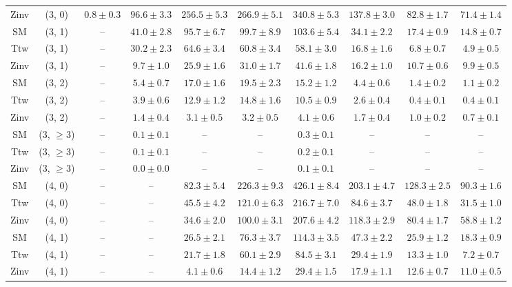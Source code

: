 \begin{table}[h!]
{\begin{tabular}{cccccccccc}
	Zinv & (3, 0) & $0.8\pm 0.3$ & $96.6\pm 3.3$ & $256.5\pm 5.3$ & $266.9\pm 5.1$ & $340.8\pm 5.3$ & $137.8\pm 3.0$ & $82.8\pm 1.7$ & $71.4\pm 1.4$ \\[0.5ex] 
	SM & (3, 1) & -- & $41.0\pm 2.8$ & $95.7\pm 6.7$ & $99.7\pm 8.9$ & $103.6\pm 5.4$ & $34.1\pm 2.2$ & $17.4\pm 0.9$ & $14.8\pm 0.7$ \\[0.5ex] 
	Ttw & (3, 1) & -- & $30.2\pm 2.3$ & $64.6\pm 3.4$ & $60.8\pm 3.4$ & $58.1\pm 3.0$ & $16.8\pm 1.6$ & $6.8\pm 0.7$ & $4.9\pm 0.5$ \\[0.5ex] 
	Zinv & (3, 1) & -- & $9.7\pm 1.0$ & $25.9\pm 1.6$ & $31.0\pm 1.7$ & $41.6\pm 1.8$ & $16.2\pm 1.0$ & $10.7\pm 0.6$ & $9.9\pm 0.5$ \\[0.5ex] 
	SM & (3, 2) & -- & $5.4\pm 0.7$ & $17.0\pm 1.6$ & $19.5\pm 2.3$ & $15.2\pm 1.2$ & $4.4\pm 0.6$ & $1.4\pm 0.2$ & $1.1\pm 0.2$ \\[0.5ex] 
	Ttw & (3, 2) & -- & $3.9\pm 0.6$ & $12.9\pm 1.2$ & $14.8\pm 1.6$ & $10.5\pm 0.9$ & $2.6\pm 0.4$ & $0.4\pm 0.1$ & $0.4\pm 0.1$ \\[0.5ex] 
	Zinv & (3, 2) & -- & $1.4\pm 0.4$ & $3.1\pm 0.5$ & $3.2\pm 0.5$ & $4.1\pm 0.6$ & $1.7\pm 0.4$ & $1.0\pm 0.2$ & $0.7\pm 0.1$ \\[0.5ex] 
	SM & (3, $\ge3$) & -- & $0.1\pm 0.1$ & -- & -- & $0.3\pm 0.1$ & -- & -- & -- \\[0.5ex] 
	Ttw & (3, $\ge3$) & -- & $0.1\pm 0.1$ & -- & -- & $0.2\pm 0.1$ & -- & -- & -- \\[0.5ex] 
	Zinv & (3, $\ge3$) & -- & $0.0\pm 0.0$ & -- & -- & $0.1\pm 0.1$ & -- & -- & -- \\[0.5ex] 
	SM & (4, 0) & -- & -- & $82.3\pm 5.4$ & $226.3\pm 9.3$ & $426.1\pm 8.4$ & $203.1\pm 4.7$ & $128.3\pm 2.5$ & $90.3\pm 1.6$ \\[0.5ex] 
	Ttw & (4, 0) & -- & -- & $45.5\pm 4.2$ & $121.0\pm 6.3$ & $216.7\pm 7.0$ & $84.6\pm 3.7$ & $48.0\pm 1.8$ & $31.5\pm 1.0$ \\[0.5ex] 
	Zinv & (4, 0) & -- & -- & $34.6\pm 2.0$ & $100.0\pm 3.1$ & $207.6\pm 4.2$ & $118.3\pm 2.9$ & $80.4\pm 1.7$ & $58.8\pm 1.2$ \\[0.5ex] 
	SM & (4, 1) & -- & -- & $26.5\pm 2.1$ & $76.3\pm 3.7$ & $114.3\pm 3.5$ & $47.3\pm 2.2$ & $25.9\pm 1.2$ & $18.3\pm 0.9$ \\[0.5ex] 
	Ttw & (4, 1) & -- & -- & $21.7\pm 1.8$ & $60.1\pm 2.9$ & $84.5\pm 3.1$ & $29.4\pm 1.9$ & $13.3\pm 1.0$ & $7.2\pm 0.7$ \\[0.5ex] 
	Zinv & (4, 1) & -- & -- & $4.1\pm 0.6$ & $14.4\pm 1.2$ & $29.4\pm 1.5$ & $17.9\pm 1.1$ & $12.6\pm 0.7$ & $11.0\pm 0.5$ \\[0.5ex] 

\end{tabular}}
\end{table}
